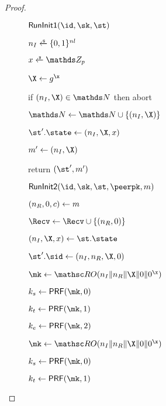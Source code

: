\begin{proof}
\begin{collectinmacro}{\SIGMIProofRecordKeysInitiatorsCopy}{}{} %
\begin{figure}[tp]
  \begin{minipage}[t]{0.49\textwidth}

    \begin{oracle}{$\RunInitI(\id, \sk, \st)$}
      \item $\nonce_I \sample \bits^{\nl}$
      \item $x \sample \ZZ_p$
      \item $\X \gets g^{\x}$
      \item if $(\nonce_I, \X) \in \N$ then abort
      \item $\N \gets \N \cup \{(\nonce_I,\X)\}$
      \item $\st'.\state \gets (\nonce_I,\X,x)$
      \item $m' \gets (\nonce_I, \X)$
      \item {}
      \item return $(\st',m')$
    \end{oracle}
    \ExptSepSpace
    \begin{oracle}{$\RunInit(\id,\sk,\st,\peerpk,m)$}
      \item $(\nonce_R,\Y,\ciph) \gets m$
      \item $\Recv \gets \Recv \cup \{(\nonce_R,\Y)\}$
      \item $(\nonce_I,\X,x) \gets \st.\state$
      \item $\st'.\sid \gets (\nonce_I,\nonce_R,\X,\Y)$
      \item {}
      \item \hindent $\mk \gets \RO(\nonce_I\|\nonce_R\|\X\|\Y\|\Y^{\x})$
      \item \hindent $\ks \gets \PRF(\mk,0)$
      \item \hindent $\kt \gets \PRF(\mk,1)$
      \item \hindent $\ke \gets \PRF(\mk,2)$
      \item \hindent \frame{$\ks,\kt,\ke \gets \S[\st'.\sid]$}
      \item {}
      \item \hindent $\mk \gets \RO(\nonce_I\|\nonce_R\|\X\|\Y\|\Y^{\x})$
      \item \hindent $\ks \gets \PRF(\mk,0)$
      \item \hindent $\kt \gets \PRF(\mk,1)$

\end{oracle}
\end{minipage}
\end{figure}
\end{collectinmacro}
\end{proof}
